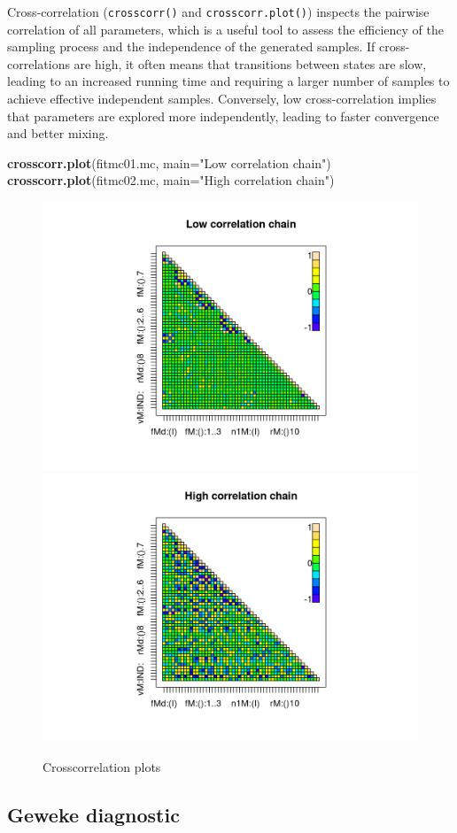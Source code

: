 \documentclass[
]{book}
\newenvironment{Shaded}{\begin{snugshade}}{\end{snugshade}}
\newcommand{\AttributeTok}[1]{\textcolor[rgb]{0.13,0.29,0.53}{#1}}
\newcommand{\FunctionTok}[1]{\textcolor[rgb]{0.13,0.29,0.53}{\textbf{#1}}}
\newcommand{\NormalTok}[1]{#1}
\newcommand{\StringTok}[1]{\textcolor[rgb]{0.31,0.60,0.02}{#1}}
\begin{document}
Cross-correlation (\texttt{crosscorr()} and \texttt{crosscorr.plot()}) inspects the pairwise correlation of all parameters, which is a useful tool to assess the efficiency of the sampling process and the independence of the generated samples. If cross-correlations are high, it often means that transitions between states are slow, leading to an increased running time and requiring a larger number of samples to achieve effective independent samples. Conversely, low cross-correlation implies that parameters are explored more independently, leading to faster convergence and better mixing.

\begin{Shaded}
\begin{Highlighting}[]
\FunctionTok{crosscorr.plot}\NormalTok{(fitmc01.mc, }\AttributeTok{main=}\StringTok{"Low correlation chain"}\NormalTok{)}
\FunctionTok{crosscorr.plot}\NormalTok{(fitmc02.mc, }\AttributeTok{main=}\StringTok{"High correlation chain"}\NormalTok{)}
\end{Highlighting}
\end{Shaded}

\begin{figure}
\includegraphics[width=0.5\linewidth]{_bookdown_files/_main_files/figure-html/ccr01-1} \includegraphics[width=0.5\linewidth]{_bookdown_files/_main_files/figure-html/ccr01-2} \caption{Crosscorrelation plots}\label{fig:ccr01}
\end{figure}

\hypertarget{geweke-diagnostic}{%
\subsection{Geweke diagnostic}\label{geweke-diagnostic}}
\end{document}
